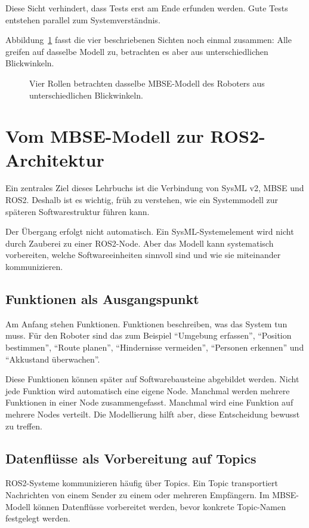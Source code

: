 Diese Sicht verhindert, dass Tests erst am Ende erfunden werden. Gute Tests entstehen parallel zum Systemverständnis.

Abbildung~\ref{fig:kap02-sichten-auf-modell} fasst die vier beschriebenen Sichten noch einmal zusammen: Alle greifen auf dasselbe Modell zu, betrachten es aber aus unterschiedlichen Blickwinkeln.

\begin{figure}[H]
  \centering
  \caption{Vier Rollen betrachten dasselbe MBSE-Modell des Roboters aus unterschiedlichen Blickwinkeln.}
  \label{fig:kap02-sichten-auf-modell}
\end{figure}

\section{Vom MBSE-Modell zur ROS2-Architektur}
Ein zentrales Ziel dieses Lehrbuchs ist die Verbindung von SysML v2, MBSE und ROS2. Deshalb ist es wichtig, früh zu verstehen, wie ein Systemmodell zur späteren Softwarestruktur führen kann.

Der Übergang erfolgt nicht automatisch. Ein SysML-Systemelement wird nicht durch Zauberei zu einer ROS2-Node. Aber das Modell kann systematisch vorbereiten, welche Softwareeinheiten sinnvoll sind und wie sie miteinander kommunizieren.

\subsection{Funktionen als Ausgangspunkt}
Am Anfang stehen Funktionen. Funktionen beschreiben, was das System tun muss. Für den Roboter sind das zum Beispiel \enquote{Umgebung erfassen}, \enquote{Position bestimmen}, \enquote{Route planen}, \enquote{Hindernisse vermeiden}, \enquote{Personen erkennen} und \enquote{Akkustand überwachen}.

Diese Funktionen können später auf Softwarebausteine abgebildet werden. Nicht jede Funktion wird automatisch eine eigene Node. Manchmal werden mehrere Funktionen in einer Node zusammengefasst. Manchmal wird eine Funktion auf mehrere Nodes verteilt. Die Modellierung hilft aber, diese Entscheidung bewusst zu treffen.

\subsection{Datenflüsse als Vorbereitung auf Topics}
ROS2-Systeme kommunizieren häufig über Topics. Ein Topic transportiert Nachrichten von einem Sender zu einem oder mehreren Empfängern. Im MBSE-Modell können Datenflüsse vorbereitet werden, bevor konkrete Topic-Namen festgelegt werden.

